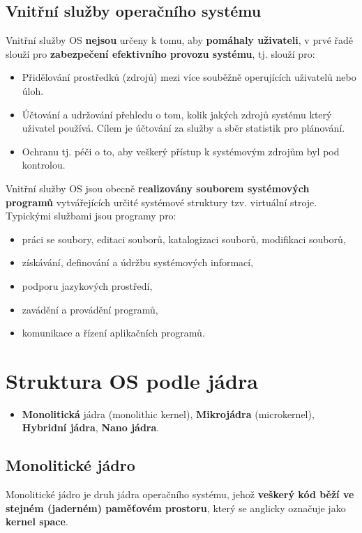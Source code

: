 \subsection{Vnitřní služby operačního systému}
Vnitřní služby OS \textbf{nejsou} určeny k tomu, aby \textbf{pomáhaly uživateli}, v prvé řadě slouží pro \textbf{zabezpečení efektivního provozu systému}, tj. slouží pro:
\begin{itemize}
    \item Přidělování prostředků (zdrojů) mezi více souběžně operujících uživatelů nebo úloh.
    \item Účtování a udržování přehledu o tom, kolik jakých zdrojů systému který uživatel používá. Cílem je účtování za služby a sběr statistik pro plánování.
    \item Ochranu tj. péči o to, aby veškerý přístup k systémovým zdrojům byl pod kontrolou.
\end{itemize}
Vnitřní služby OS jsou obecně \textbf{realizovány souborem systémových programů} vytvářejících určité systémové struktury tzv. virtuální stroje. Typickými službami jsou programy pro:
\begin{itemize}
    \item práci se soubory, editaci souborů, katalogizaci souborů, modifikaci souborů,
    \item získávání, definování a údržbu systémových informací,
    \item podporu jazykových prostředí,
    \item zavádění a provádění programů,
    \item komunikace a řízení aplikačních programů.
\end{itemize}

\section{Struktura OS podle jádra}
\begin{itemize}
    \item \textbf{Monolitická} jádra (monolithic kernel), \textbf{Mikrojádra} (microkernel), \textbf{Hybridní jádra}, \textbf{Nano jádra}.
\end{itemize}
\subsection{Monolitické jádro}
Monolitické jádro je druh jádra operačního systému, jehož \textbf{veškerý kód běží ve stejném (jaderném) paměťovém prostoru}, který se anglicky označuje jako \textbf{kernel space}.

